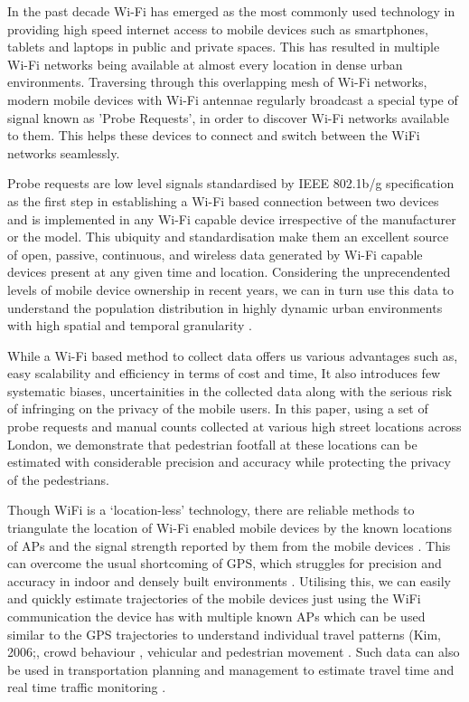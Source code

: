 In the past decade Wi-Fi has emerged as the most commonly used technology in providing high speed internet access to mobile devices such as smartphones, tablets and laptops in public and private spaces. This has resulted in multiple Wi-Fi networks being available at almost every location in dense urban environments. Traversing through this overlapping mesh of Wi-Fi networks, modern mobile devices with Wi-Fi antennae regularly broadcast a special type of signal known as 'Probe Requests', in order to discover Wi-Fi networks available to them. This helps these devices to connect and switch between the WiFi networks seamlessly.

Probe requests are low level signals standardised by IEEE 802.1b/g specification \citep{ieee2013} as the first step in establishing a Wi-Fi based connection between two devices and is implemented in any Wi-Fi capable device irrespective of the manufacturer or the model. This ubiquity and standardisation make them an excellent source of open, passive, continuous, and wireless data generated by Wi-Fi capable devices present at any given time and location. Considering the unprecendented levels of mobile device ownership in recent years, we can in turn use this data to understand the population distribution in highly dynamic urban environments with high spatial and temporal granularity \citep{freud2015,konto2017}.

While a Wi-Fi based method to collect data offers us various advantages such as, easy scalability and efficiency in terms of cost and time, It also introduces few systematic biases, uncertainities in the collected data along with the serious risk of infringing on the privacy of the mobile users. In this paper, using a set of probe requests and manual counts collected at various high street locations across London, we demonstrate that pedestrian footfall at these locations can be estimated with considerable precision and accuracy while protecting the privacy of the pedestrians.

Though WiFi is a `location-less' technology, there are reliable methods to triangulate the location of Wi-Fi enabled mobile devices by the known locations of APs and the signal strength reported by them from the mobile devices \citep{he2003range, moore2004robust, lamarca2005place}.
This can overcome the usual shortcoming of GPS, which struggles for precision and accuracy in indoor and densely built environments \citep{zarim2006,kawaguchi2009wifi, xi2010locating}. 
Utilising this, we can easily and quickly estimate trajectories of the mobile devices just using the WiFi communication the device has with multiple known APs \citep{Sorensenlocation} which can be used similar to the GPS trajectories to understand individual travel patterns (Kim, 2006;\citep{reki2007,Sap2015}, crowd behaviour \citep{abedi2013bluetooth,mowafi2013tracking}, vehicular \citep{lu2010vehicle} and pedestrian movement \citep{xu2013pedestrian,fukuzaki2014pedestrian,wang2016gait}.
Such data can also be used in transportation planning and management to estimate travel time \citep{musa2011wiflow} and real time traffic monitoring \citep{abbott2013empirical}.

